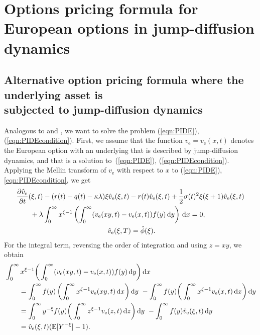 \chapter[Options pricing formula for European options in jump-diffusion dynamics]{Options pricing formula for European options in jump-diffusion dynamics}

\section{Alternative option pricing formula where the underlying asset is \\
subjected to jump-diffusion dynamics}
Analogous to \cite{Merton1976} and \cite{Frontczak2013}, we want to solve the problem (\ref{eqn:PIDE}), (\ref{eqn:PIDEcondition}). First, we assume that the function $v_\text{e} = v_\text{e}(x,t)$ denotes the European option with an underlying that is described by jump-diffusion dynamics, and that is a solution to~(\ref{eqn:PIDE}), (\ref{eqn:PIDEcondition}). Applying the Mellin transform of $v_\text{e}$ with respect to $x$ to (\ref{eqn:PIDE}), \eqref{eqn:PIDEcondition}, we get
	\begin{align}
		\label{eqn:PIDEMellin}
		\begin{split}
		&\frac{\partial \hat v_\text{e}}{\partial t}(\xi,t) - (r(t) - q(t) - \kappa\lambda)\xi \hat v_\text{e}(\xi,t) -r(t)\hat v_\text{e}(\xi,t) + \frac{1}			{2}\sigma(t)^2\xi(\xi+1)\hat v_\text{e}(\xi,t) \\
		&\qquad + \lambda \int_0^\infty x^{\xi-1} \left( \int_0^\infty (v_\text{e}(xy,t) - v_\text{e}(x,t))f(y) \, \mathrm d y \right) \, \mathrm d x = 0, \\
		&\qquad \qquad \qquad \qquad \qquad \qquad \quad \hat v_\text{e}(\xi,T) = \hat \phi(\xi).
		\end{split}
	\end{align}
For the integral term, reversing the order of integration and using $z = xy$, we obtain
	\begin{align*}
		&\int_0^\infty x^{\xi-1} \bigg( \int_0^\infty (v_\text{e}(xy,t) - v_\text{e}(x,t))f(y) \, \mathrm d y \bigg) \, \mathrm d x \\
		&\qquad =\int_0^\infty f(y) \left( \int_0^\infty x^{\xi-1} v_\text{e}(xy,t) \, \mathrm d x \right) \mathrm d y \ - \int_0^\infty f(y) \bigg( \int_0^\infty x^{\xi-1}v_\text{e}(x,t) \, \mathrm d x \bigg) \, \mathrm d y \\
		&\qquad = \int_0^\infty y^{-\xi}f(y) \bigg( \int_0^\infty z^{\xi-1}v_\text{e}(z,t) \, \mathrm d z \bigg) \, \mathrm d y \ - \int_0^\infty f(y) \hat v_\text{e}(\xi,t) \, \mathrm d y \\
		&\qquad = \hat v_\text{e}(\xi,t) (\mathbb E[Y^{-\xi}]	 - 1).
	\end{align*}
